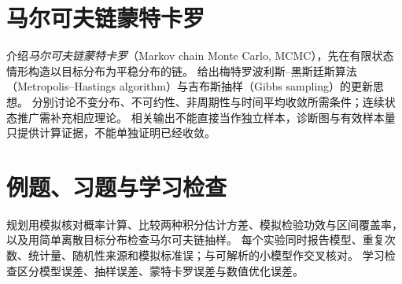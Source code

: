 \section{马尔可夫链蒙特卡罗}
\label{sec:ps-mcmc}
介绍\emph{马尔可夫链蒙特卡罗}（Markov chain Monte Carlo, MCMC），先在有限状态情形构造以目标分布为平稳分布的链。
给出梅特罗波利斯--黑斯廷斯算法（Metropolis--Hastings algorithm）与吉布斯抽样（Gibbs sampling）的更新思想。
分别讨论不变分布、不可约性、非周期性与时间平均收敛所需条件；连续状态推广需补充相应理论。
相关输出不能直接当作独立样本，诊断图与有效样本量只提供计算证据，不能单独证明已经收敛。

\section{例题、习题与学习检查}
规划用模拟核对概率计算、比较两种积分估计方差、模拟检验功效与区间覆盖率，以及用简单离散目标分布检查马尔可夫链抽样。
每个实验同时报告模型、重复次数、统计量、随机性来源和模拟标准误；与可解析的小模型作交叉核对。
学习检查区分模型误差、抽样误差、蒙特卡罗误差与数值优化误差。




